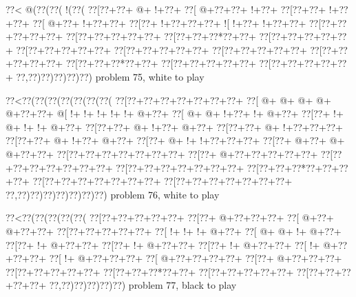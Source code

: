 \vbox{\vbox{\goo
\0??<\- @(\0??(\0??(\- !(\0??(
\0??[\0??+\0??+\- @+\- !+\0??+
\0??[\- @+\0??+\0??+\- !+\0??+
\0??[\0??+\0??+\- !+\0??+\0??+
\0??[\- @+\0??+\- !+\0??+\0??+
\0??[\0??+\- !+\0??+\0??+\0??+
\- ![\- !+\0??+\- !+\0??+\0??+
\0??[\0??+\0??+\0??+\0??+\0??+
\0??[\0??+\0??+\0??+\0??+\0??+
\0??[\0??+\0??+\0??*\0??+\0??+
\0??[\0??+\0??+\0??+\0??+\0??+
\0??[\0??+\0??+\0??+\0??+\0??+
\0??[\0??+\0??+\0??+\0??+\0??+
\0??[\0??+\0??+\0??+\0??+\0??+
\0??[\0??+\0??+\0??+\0??+\0??+
\0??[\0??+\0??+\0??*\0??+\0??+
\0??[\0??+\0??+\0??+\0??+\0??+
\0??[\0??+\0??+\0??+\0??+\0??+
\0??,\0??)\0??)\0??)\0??)\0??)
}
\hfil problem 75, white to play\hfil\break
}

\vbox{\vbox{\goo
\0??<\0??(\0??(\0??(\0??(\0??(\0??(\0??(
\0??[\0??+\0??+\0??+\0??+\0??+\0??+\0??+
\0??[\- @+\- @+\- @+\- @+\- @+\0??+\0??+
\- @[\- !+\- !+\- !+\- !+\- !+\- @+\0??+
\0??[\- @+\- @+\- !+\0??+\- !+\- @+\0??+
\0??[\0??+\- !+\- @+\- !+\- !+\- @+\0??+
\0??[\0??+\0??+\- @+\- !+\0??+\- @+\0??+
\0??[\0??+\0??+\- @+\- !+\0??+\0??+\0??+
\0??[\0??+\0??+\- @+\- !+\0??+\- @+\0??+
\0??[\0??+\- @+\- !+\- !+\0??+\0??+\0??+
\0??[\0??+\- @+\0??+\- @+\- @+\0??+\0??+
\0??[\0??+\0??+\0??+\0??+\0??+\0??+\0??+
\0??[\0??+\- @+\0??+\0??+\0??+\0??+\0??+
\0??[\0??+\0??+\0??+\0??+\0??+\0??+\0??+
\0??[\0??+\0??+\0??+\0??+\0??+\0??+\0??+
\0??[\0??+\0??+\0??*\0??+\0??+\0??+\0??+
\0??[\0??+\0??+\0??+\0??+\0??+\0??+\0??+
\0??[\0??+\0??+\0??+\0??+\0??+\0??+\0??+
\0??,\0??)\0??)\0??)\0??)\0??)\0??)\0??)
}
\hfil problem 76, white to play\hfil\break
}

\vbox{\vbox{\goo
\0??<\0??(\0??(\0??(\0??(\0??(
\0??[\0??+\0??+\0??+\0??+\0??+
\0??[\0??+\- @+\0??+\0??+\0??+
\0??[\- @+\0??+\- @+\0??+\0??+
\0??[\0??+\0??+\0??+\0??+\0??+
\0??[\- !+\- !+\- !+\- @+\0??+
\0??[\- @+\- @+\- !+\- @+\0??+
\0??[\0??+\- !+\- @+\0??+\0??+
\0??[\0??+\- !+\- @+\0??+\0??+
\0??[\0??+\- !+\- @+\0??+\0??+
\0??[\- !+\- @+\0??+\0??+\0??+
\0??[\- !+\- @+\0??+\0??+\0??+
\0??[\- @+\0??+\0??+\0??+\0??+
\0??[\0??+\- @+\0??+\0??+\0??+
\0??[\0??+\0??+\0??+\0??+\0??+
\0??[\0??+\0??+\0??*\0??+\0??+
\0??[\0??+\0??+\0??+\0??+\0??+
\0??[\0??+\0??+\0??+\0??+\0??+
\0??,\0??)\0??)\0??)\0??)\0??)
}
\hfil problem 77, black to play\hfil\break
}


